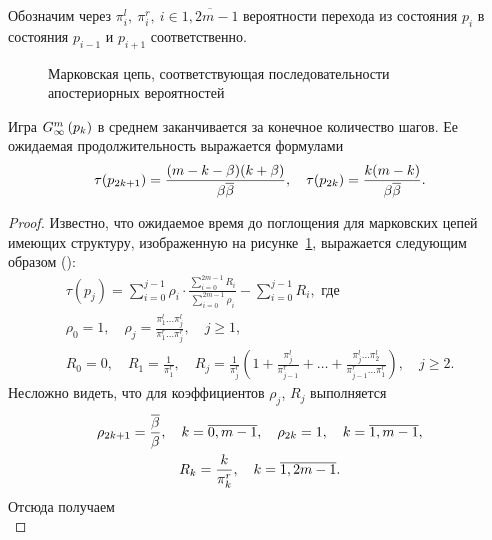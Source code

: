 {Обозначим через $\pi^l_i,\ \pi^r_i,\ i \in \overline{1, 2m-1}$ вероятности перехода из состояния $p_i$ в состояния $p_{i-1}$ и $p_{i+1}$ соответственно.

\begin{figure}[tb]
  \centering
  
  \caption[Последовательность апостериорных вероятностей]{Марковская цепь,
    соответствующая последовательности апостериорных вероятностей}
  \label{ch1:fig:posterior-markov}
\end{figure}

\begin{proposition}
  \label{ch1:prop:game-duration}
  Игра $G_{\infty}^m\left({p_k}\right)$ в среднем заканчивается за конечное количество шагов.
  Ее ожидаемая продолжительность выражается формулами
  \begin{equation*} 
    \tau(p_{2k+1}) = \frac{(m-k-\beta)(k+\beta)}{\beta {\overline{\beta}}},\quad
    \tau(p_{2k}) = \frac{k(m-k)}{\beta {\overline{\beta}}}.
  \end{equation*}
\end{proposition}
\begin{proof}
  Известно, что ожидаемое время до поглощения для марковских цепей имеющих структуру, изображенную на рисунке~\ref{ch1:fig:posterior-markov}, выражается следующим образом (\seename \cite[\S~12]{shiryaev11}):
  \begin{gather}
    \label{ch1:prop:game-duration:eq:1}
    \tau(p_j) =
    \sum_{i=0}^{j-1} \rho_i \cdot
    \frac{\sum_{i=0}^{2m-1} R_i}{\sum_{i=0}^{2m-1} \rho_i} -
    \sum_{i=0}^{j-1} R_i, \text{ где}\\
    \rho_0 = 1, \quad
    \rho_j = \frac{\pi^l_1 \ldots \pi^l_j}{\pi^r_1 \ldots \pi^r_j}, \quad j \geq 1,\nonumber\\
    R_0 = 0, \quad
    R_1 = \frac{1}{\pi^r_1}, \quad
    R_j = \frac{1}{\pi^r_j}\left( 
      1 + 
      \frac{\pi^l_j}{\pi^r_{j-1}} + 
      \ldots + \frac{\pi^l_j \ldots \pi^l_2}{\pi^r_{j-1} \ldots \pi^r_1}
    \right), \quad j \geq 2.\nonumber
  \end{gather}
  Несложно видеть, что для коэффициентов $\rho_j$, $R_j$ выполняется
  \begin{gather*}
    \rho_{2k+1} = \frac{{\overline{\beta}}}{\beta},\quad k = \overline{0, m-1},\quad
    \rho_{2k} = 1,\quad k = \overline{1, m-1},\\
    R_k = \frac{k}{\pi^r_k},\quad k = \overline{1, 2m-1}.
  \end{gather*}
  Отсюда получаем
  \begin{equation}
    \label{ch1:prop:game-duration:eq:2}

\end{equation}
\end{proof}}
